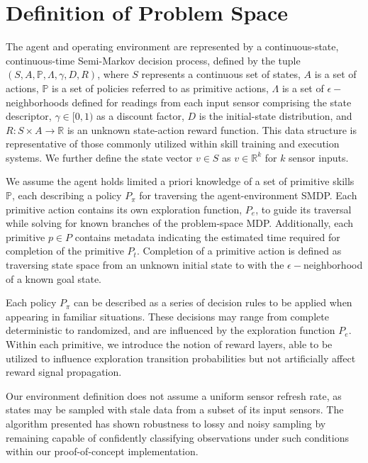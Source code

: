 \documentclass[letterpaper]{article}
\begin{document}
\section{Definition of Problem Space}
\label{sec:pspace}
  The agent and operating environment are represented by a continuous-state, continuous-time Semi-Markov decision process, defined by the tuple $(S,A,\mathbb{P},\Lambda,\gamma,D,R)$, where $S$ represents a continuous set of states, $A$ is a set of actions, $\mathbb{P}$ is a set of policies referred to as primitive actions, $\Lambda$ is a set of $\epsilon-$neighborhoods defined for readings from each input sensor comprising the state descriptor, $\gamma \in [0,1)$ as a discount factor, $D$ is the initial-state distribution, and $R : S \times A \rightarrow \mathbb{R}$ is an unknown state-action reward function. This data structure is representative of those commonly utilized within skill training and execution systems. We further define the state vector $v \in S$ as $v \in \mathbb{R}^k$ for $k$ sensor inputs.

We assume the agent holds limited a priori knowledge of a set of primitive skills $\mathbb{P}$, each describing a policy $P_\pi$ for traversing the agent-environment SMDP. Each primitive action contains its own exploration function, $P_e$, to guide its traversal while solving for known branches of the problem-space MDP. Additionally, each primitive $p \in P$ contains metadata indicating the estimated time required for completion of the primitive $P_t$. Completion of a primitive action is defined as traversing state space from an unknown initial state to with the $\epsilon-$neighborhood of a known goal state.

Each policy $P_\pi$ can be described as a series of decision rules to be applied when appearing in familiar situations. These decisions may range from complete deterministic to randomized, and are influenced by the exploration function $P_e$. Within each primitive, we introduce the notion of reward layers, able to be utilized to influence exploration transition probabilities but not artificially affect reward signal propagation.

Our environment definition does not assume a uniform sensor refresh rate, as states may be sampled with stale data from a subset of its input sensors. The algorithm presented has shown robustness to lossy and noisy sampling by remaining capable of confidently classifying observations under such conditions within our proof-of-concept implementation.
\end{document}
